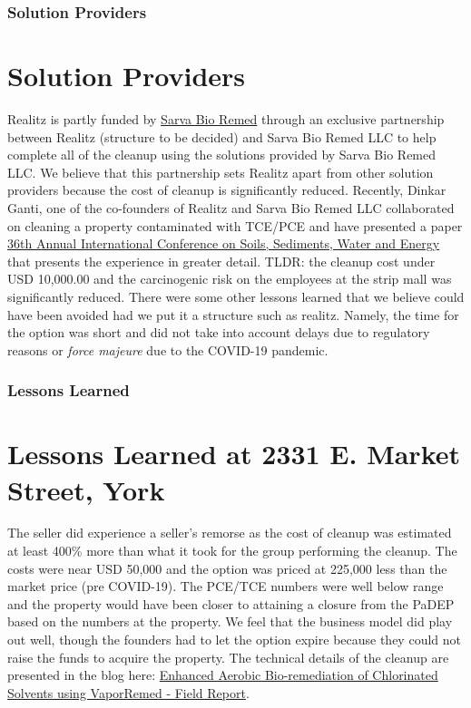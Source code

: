 \documentclass{beamer}
\begin{document}
\begin{frame}
\frametitle{Solution Providers}

\section{Solution Providers}

Realitz is partly funded by \href{https://www.sarvabioremed.com}{Sarva Bio Remed} through an exclusive partnership between Realitz (structure to be decided) and Sarva Bio Remed LLC to help complete all of the cleanup using the solutions provided by Sarva Bio Remed LLC. We believe that this partnership sets Realitz apart from other solution providers because the cost of cleanup is significantly reduced. Recently, Dinkar Ganti, one of the co-founders of Realitz and Sarva Bio Remed LLC collaborated on cleaning a property contaminated with TCE/PCE and have presented a paper \href{https://aehsconference.pathable.co/}{36th Annual International Conference on Soils, Sediments, Water and Energy} that presents the experience in greater detail. TLDR: the cleanup cost under USD 10,000.00 and the carcinogenic risk on the employees at the strip mall was significantly reduced. There were some other lessons learned that we believe could have been avoided had we put it a structure such as realitz. Namely, the time for the option was short and did not take into account delays due to regulatory reasons or \textit{force majeure} due to the COVID-19 pandemic. 

\end{frame}

\begin{frame}
\frametitle{Lessons Learned }

\section{Lessons Learned at 2331 E. Market Street, York}

The seller did experience a seller's remorse as the cost of cleanup was estimated at least 400\% more than what it took for the group performing the cleanup. The costs were near USD 50,000 and the option was priced at 225,000 less than the market price (pre COVID-19). The PCE/TCE numbers were well below range and the property would have been closer to attaining a closure from the PaDEP based on the numbers at the property. We feel that the business model did play out well, though the founders had to let the option expire because they could not raise the funds to acquire the property.
The technical details of the cleanup are presented in the blog here: \href{https://dservgun.github.io/}{Enhanced Aerobic Bio-remediation of Chlorinated Solvents using VaporRemed - Field Report}. 
\end{frame}
\end{document}
